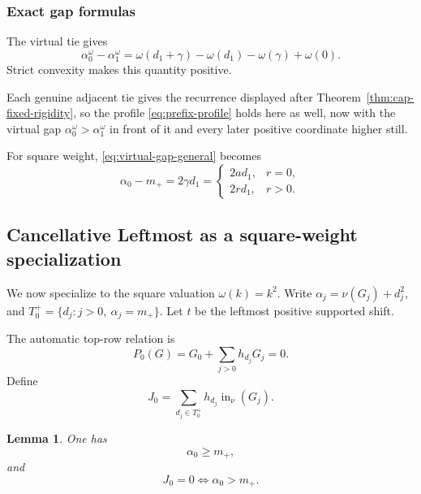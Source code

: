 \documentclass[11pt,a4paper]{amsart}
\numberwithin{equation}{section}
\theoremstyle{plain}
\newtheorem{lemma}[theorem]{Lemma}
\theoremstyle{definition}
\newcommand{\wt}{\nu}
\newcommand{\inin}{\operatorname{in}}
\begin{document}
\subsubsection{Exact gap formulas}

The virtual tie gives
\begin{equation}\label{eq:virtual-gap-general}
\alpha_0^\omega-\alpha_1^\omega
=
\omega(d_1+\gamma)-\omega(d_1)-\omega(\gamma)+\omega(0).
\end{equation}
Strict convexity makes this quantity positive.

Each genuine adjacent tie gives the recurrence displayed after Theorem~\ref{thm:cap-fixed-rigidity}, so the profile \eqref{eq:prefix-profile} holds here as well, now with the virtual gap \(\alpha_0^\omega>\alpha_1^\omega\) in front of it and every later positive coordinate higher still.

For square weight, \eqref{eq:virtual-gap-general} becomes
\begin{equation}\label{eq:square-gap}
\alpha_0-m_+
=2\gamma d_1
=\begin{cases}
2a d_1,&r=0,\\
2r d_1,&r>0.
\end{cases}
\end{equation}

\subsection{Cancellative Leftmost as a square-weight specialization}\label{subsec:floor}

We now specialize to the square valuation \(\omega(k)=k^2\).
Write \(\alpha_j=\wt(G_j)+d_j^2\),
and \(T_0^+=\{d_j:j>0,\ \alpha_j=m_+\}\).
Let \(t\) be the leftmost positive supported shift.

The automatic top-row relation is
\begin{equation}\label{eq:P0}
P_0(G)=G_0+\sum_{j>0}h_{d_j}G_j=0.
\end{equation}
Define
\begin{equation}\label{eq:J0}
J_0
=
\sum_{d_j\in T_0^+}h_{d_j}\inin_{\wt}(G_j).
\end{equation}

\begin{lemma}\label{lem:laplace-equivalence}
One has
\[
\alpha_0\ge m_+,
\]
and
\begin{equation}\label{eq:J0-equivalence}
J_0=0\iff\alpha_0>m_+.
\end{equation}
\end{lemma}
\end{document}

